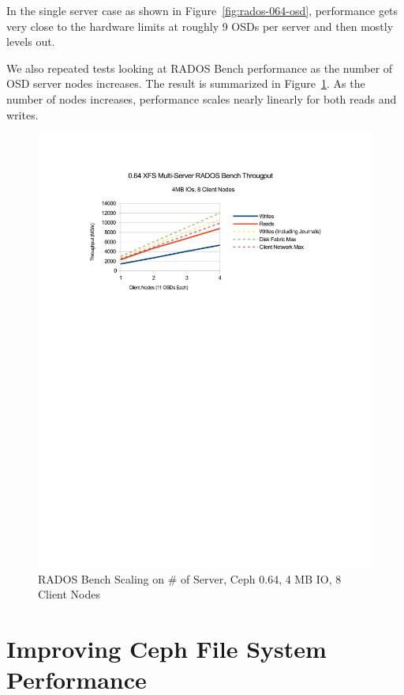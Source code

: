 \documentclass{article}
\begin{document}
In the single server case as shown in Figure~\ref{fig:rados-064-osd},
performance gets very close to the hardware limits at roughly 9 OSDs per server
and then mostly levels out.

We also repeated tests looking at RADOS Bench performance as the
number of OSD server nodes increases. The result is summarized in
Figure~\ref{fig:rados-064-oss}. As the number of nodes increases, performance
scales nearly linearly for both reads and writes.


\begin{figure}[htb]
\centering
\includegraphics[width=5in]{rados-064-oss}
\caption{RADOS Bench Scaling on \# of Server, Ceph 0.64, 4 MB IO, 8 Client Nodes}
\label{fig:rados-064-oss}
\end{figure}



\section{Improving Ceph File System Performance}
\end{document}
